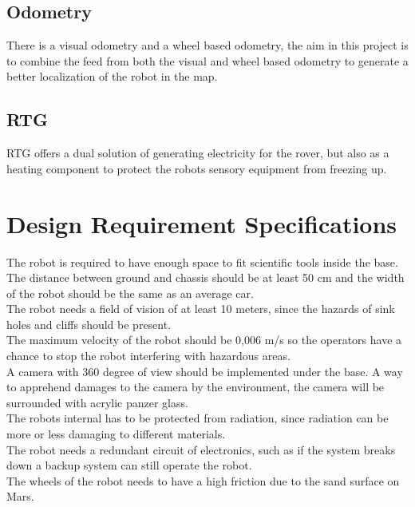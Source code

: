 \subsection{Odometry}
There is a visual odometry and a wheel based odometry, the aim in this project is to combine the feed from both the visual and wheel based odometry to generate a better localization of the robot in the map.

\subsection{RTG}
RTG offers a dual solution of generating electricity for the rover, but also as a heating component to protect the robots sensory equipment from freezing up.

\section{Design Requirement Specifications} \label{ch:Designrequiremnts}
The robot is required to have enough space to fit scientific tools inside the base.\\  
The distance between ground and chassis should be at least 50 cm and the width of the robot should be the same as an average car.\\ 
The robot needs a field of vision of at least 10 meters, since the hazards of sink holes and cliffs should be present.\\
The maximum velocity of the robot should be 0,006 m/s so the operators have a chance to stop the robot interfering with hazardous areas.\\
A camera with 360 degree of view should be implemented under the base. A way to apprehend damages to the camera by the environment, the camera will be surrounded with acrylic panzer glass\cite{Lidar360}.\\ 
The robots internal has to be protected from radiation, since radiation can be more or less damaging to different materials\cite{radiationEffectsInMaterials}.\\
The robot needs a redundant circuit of electronics, such as if the system breaks down a backup system can still operate the robot.\\
The wheels of the robot needs to have a high friction due to the sand surface on Mars\cite{sand}.